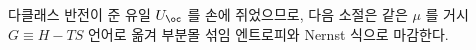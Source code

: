 다클래스 반전이 준 유일 $U_\oc$ 를 손에 쥐었으므로, 다음 소절은 같은 $\mu$ 를 거시 $G\equiv H-TS$ 언어로
옮겨 부분몰 섞임 엔트로피와 Nernst 식으로 마감한다.

%

%
%
